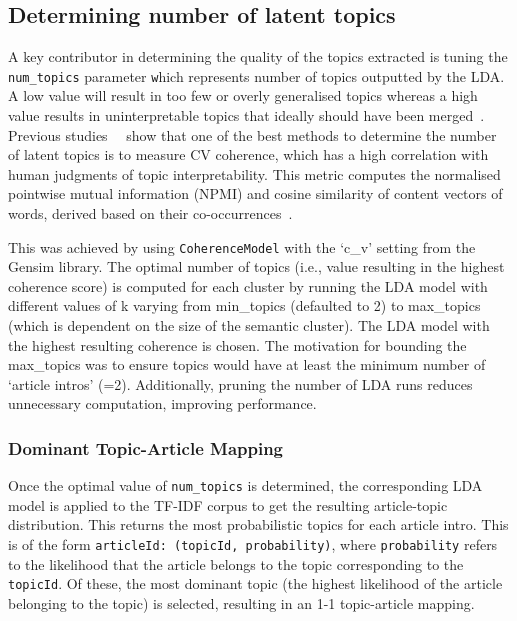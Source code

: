 \subsection{Determining number of latent topics}

A key contributor in determining the quality of the topics extracted is tuning the \texttt{num\_topics} parameter \texttt which represents number of topics outputted by the LDA. A low value will result in too few or overly generalised topics whereas a high value results in uninterpretable topics that ideally should have been merged~\cite{topic_score}. Previous studies~\cite{cv_abstract}~\cite{cv_space} show that one of the best methods to determine the number of latent topics is to measure CV coherence, which has a high correlation with human judgments of topic interpretability. This metric computes the normalised pointwise mutual information (NPMI) and cosine similarity of content vectors of words, derived based on their co-occurrences~\cite{cv_space}.

This was achieved by using \texttt{CoherenceModel} with the `c\_v' setting from the Gensim library. The optimal number of topics (i.e., value resulting in the highest coherence score) is computed for each cluster by running the LDA model with different values of k varying from min\_topics (defaulted to 2) to max\_topics (which is dependent on the size of the semantic cluster). The LDA model with the highest resulting coherence is chosen. The motivation for bounding the max\_topics was to ensure topics would have at least the minimum number of `article intros' (=2). Additionally, pruning the number of LDA runs reduces unnecessary computation, improving performance.

\subsubsection*{Dominant Topic-Article Mapping} \label{sec:topic_article_mapping}
Once the optimal value of \texttt{num\_topics} is determined, the corresponding LDA model is applied to the TF-IDF corpus to get the resulting article-topic distribution. This returns the most probabilistic topics for each article intro. This is of the form \texttt{articleId: (topicId, probability)}, where \texttt{probability} refers to the likelihood that the article belongs to the topic corresponding to the \texttt{topicId}. Of these, the most dominant topic (the highest likelihood of the article belonging to the topic) is selected, resulting in an 1-1 topic-article mapping. 

